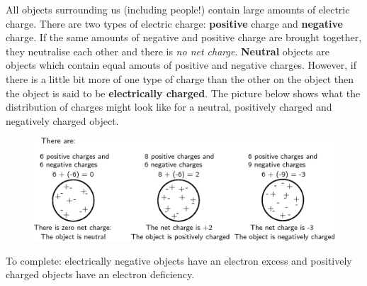       
      \label{m38780*id200267}All objects surrounding us (including people!) contain large amounts of electric charge. There
are two types of electric charge: \textbf{positive} charge and \textbf{negative} charge.
If the same amounts
of negative and positive charge are brought together, they neutralise each other and there
is \textsl{no net charge}. \textbf{Neutral} objects are objects which contain equal amouts of positive
and negative charges. However, if there is a little bit more of one type of charge than the other on the
object then the object is said to be \textbf{electrically charged}. The picture below shows
what the distribution of charges might look like for a neutral, positively charged and
negatively charged object.\par 
      \label{m38780*id200640}
        
    \setcounter{subfigure}{0}


	\begin{figure}[H] %
    \begin{center}
    \label{m38780*id200643!!!underscore!!!media}\label{m38780*id200643!!!underscore!!!printimage}\includegraphics[width=0.8\columnwidth]{col11305.imgs/m38780_PG10C8_001.png} %
        
      \vspace{2pt}
    \vspace{.1in}
    
    \end{center}

 \end{figure}   

    \addtocounter{footnote}{-0}
    
      \par \label{m38780*eip-429}To complete: electrically negative objects have an electron excess and positively charged objects have an electron deficiency.\par 
    
    
    \label{m38780*cid5}
